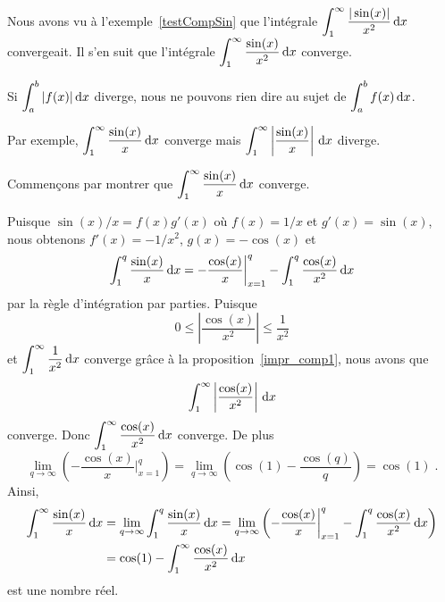 {\begin{egg}
Nous avons vu à l'exemple~\ref{testCompSin} que l'intégrale
$\displaystyle \int_1^\infty \frac{|\sin(x)|}{x^2} \,\mathrm{d}x$ convergeait.
Il s'en suit que l'intégrale
$\displaystyle \int_1^\infty \frac{\sin(x)}{x^2} \,\mathrm{d}x$ converge.
\end{egg}

\begin{rmk}[\theory]
Si $\displaystyle \int_a^b |f(x)| \,\mathrm{d}x$ diverge, nous ne pouvons rien dire au
sujet de $\displaystyle \int_a^b f(x) \,\mathrm{d}x$.

Par exemple, $\displaystyle \int_1^\infty \frac{\sin(x)}{x} \,\mathrm{d}x$
converge mais
$\displaystyle \int_1^\infty \left| \frac{\sin(x)}{x} \right| \,\mathrm{d}x$
diverge.

 Commençons par montrer que
$\displaystyle \int_1^\infty \frac{\sin(x)}{x} \,\mathrm{d}x$ converge.

Puisque $\sin(x)/x = f(x)g'(x)$ où $f(x) = 1/x$ et $g'(x) = \sin(x)$, nous
obtenons $f'(x) = -1/x^2$, $g(x) = -\cos(x)$ et
\[
\int_1^q \frac{\sin(x)}{x} \,\mathrm{d}x = -\frac{\cos(x)}{x} \bigg|_{x=1}^q
- \int_1^q \frac{\cos(x)}{x^2} \,\mathrm{d}x
\]
par la règle d'intégration par parties.  Puisque
\[
0 \leq \left| \frac{\cos(x)}{x^2} \right| \leq \frac{1}{x^2}
\]
et $\displaystyle \int_1^\infty \frac{1}{x^2} \,\mathrm{d}x$ converge grâce
à la proposition~\ref{impr_comp1}, nous avons que
\[
\int_1^\infty \left| \frac{\cos(x)}{x^2} \right| \,\mathrm{d}x
\]
converge.  Donc
$\displaystyle \int_1^\infty \frac{\cos(x)}{x^2} \,\mathrm{d}x$ converge.  De
plus
\[
\lim_{q\rightarrow \infty} \left( -\frac{\cos(x)}{x} \bigg|_{x=1}^q \right)
= \lim_{q\rightarrow \infty} \left(\cos(1) -\frac{\cos(q)}{q} \right) =
\cos(1) \; . 
\]
Ainsi,
\begin{align*}
\int_1^\infty \frac{\sin(x)}{x} \,\mathrm{d}x
&= \lim_{q\rightarrow \infty} \int_1^q \frac{\sin(x)}{x} \,\mathrm{d}x
= \lim_{q\rightarrow \infty} \left( -\frac{\cos(x)}{x} \bigg|_{x=1}^q
- \int_1^q \frac{\cos(x)}{x^2} \,\mathrm{d}x \right) \\
&= \cos(1) - \int_1^\infty \frac{\cos(x)}{x^2} \,\mathrm{d}x
\end{align*}
est une nombre réel.


\end{rmk}}
